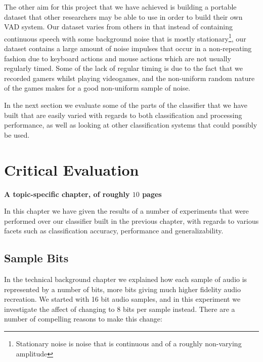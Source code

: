 \documentclass[ %
                    author={Sam Phippen},
                supervisor={Dr. Rafal Bogacz},
                     title={Real time voice activity detectors in noisy personal computing environments},
                  subtitle={},
                    degree={MEng},
                      year={2012} ]{thesis}
\begin{document}
The other aim for this project that we have achieved is building a portable
dataset that other researchers may be able to use in order to build their own
VAD system. Our dataset varies from others in that instead of containing
continuous speech with some background noise that is mostly
stationary\footnote{Stationary noise is noise that is continuous and of a roughly
non-varying amplitude}, our dataset contains a large amount of noise impulses
that occur in a non-repeating fashion due to keyboard actions and mouse actions
which are not usually regularly timed. Some of the lack of regular timing is
due to the fact that we recorded gamers whilst playing videogames, and the
non-uniform random nature of the games makes for a good non-uniform sample of
noise.

In the next section we evaluate some of the parts of the classifier that we
have built that are easily varied with regards to both classification and
processing performance, as well as looking at other classification systems that
could possibly be used.


\chapter{Critical Evaluation}
\label{chap:evaluation}

{\bf A topic-specific chapter, of roughly $10$ pages}
\vspace{1cm}

In this chapter we have given the results of a number of experiments that were
performed over our classifier built in the previous chapter, with regards to
various facets such as classification accuracy, performance and
generalizability.

\section{Sample Bits}

In the technical background chapter we explained how each sample of audio is
represented by a number of bits, more bits giving much higher fidelity audio
recreation. We started with 16 bit audio samples, and in this experiment we
investigate the affect of changing to 8 bits per sample instead. There are a
number of compelling reasons to make this change:
\end{document}
